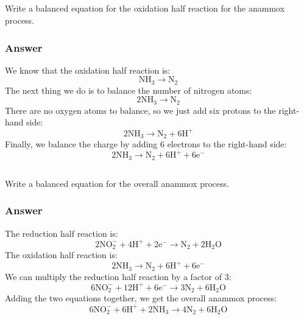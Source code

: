 \documentclass[12pt]{article}
\begin{document}
\subsection{}

Write a balanced equation for the oxidation half reaction for the anammox process.
\subsubsection{Answer}
We know that the oxidation half reaction is:
\begin{equation}
\mathrm{NH}_{3} \rightarrow \mathrm{N}_{2}
\end{equation}
The next thing we do is to balance the number of nitrogen atoms:
\begin{equation}
2 \mathrm{NH}_{3} \rightarrow \mathrm{N}_{2}
\end{equation}
There are no oxygen atoms to balance, so we just add six protons to the right-hand side:
\begin{equation}
2 \mathrm{NH}_{3} \rightarrow \mathrm{N}_{2}+6 \mathrm{H}^{+}
\end{equation}
Finally, we balance the charge by adding 6 electrons to the right-hand side:
\begin{equation}
2 \mathrm{NH}_{3} \rightarrow \mathrm{N}_{2}+6 \mathrm{H}^{+}+6 \mathrm{e}^{-}
\end{equation}
\subsection{}

Write a balanced equation for the overall anammox process.
\subsubsection{Answer}
The reduction half reaction is:
\begin{equation}
2 \mathrm{NO}_{2}^{-}+4 \mathrm{H}^{+}+2 \mathrm{e}^{-} \rightarrow \mathrm{N}_{2}+2 \mathrm{H}_{2} \mathrm{O}
\end{equation}
The oxidation half reaction is:
\begin{equation}
2 \mathrm{NH}_{3} \rightarrow \mathrm{N}_{2}+6 \mathrm{H}^{+}+6 \mathrm{e}^{-}
\end{equation}
We can multiply the reduction half reaction by a factor of 3:
\begin{equation}
6 \mathrm{NO}_{2}^{-}+12 \mathrm{H}^{+}+6 \mathrm{e}^{-} \rightarrow 3 \mathrm{N}_{2}+6 \mathrm{H}_{2} \mathrm{O}
\end{equation}
Adding the two equations together, we get the overall anammox process:
\begin{equation}
6 \mathrm{NO}_{2}^{-}+6 \mathrm{H}^{+}+2 \mathrm{NH}_{3} \rightarrow 4 \mathrm{N}_{2}+6 \mathrm{H}_{2} \mathrm{O}
\end{equation}
\end{document}
